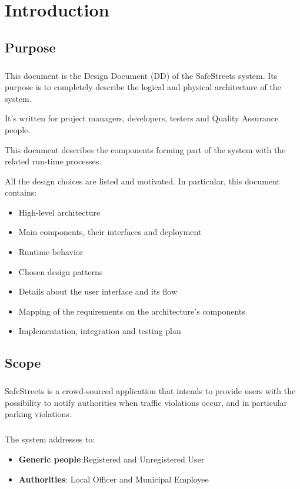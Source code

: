 	\chapter{Introduction}
		\section{Purpose}
			\paragraph{}
					This document is the Design Document (DD) of the SafeStreets system. Its purpose is to completely describe the logical and physical architecture of the system.
					
					It's written for project managers, developers, testers and Quality Assurance people.
					
					This document describes	the	components forming part of the	system with the related run-time processes.
					
					All the	design choices are listed and motivated. In particular, this document contains:
						\begin{itemize}
							\item  High-level architecture
							\item Main	components, their interfaces and deployment
							\item Runtime behavior
							\item Chosen design	patterns
							\item Details about	the	user interface and its flow
							\item Mapping of the requirements on the architecture's components
							\item Implementation, integration and testing plan
						\end{itemize}

		\section{Scope}
			\paragraph{}
				SafeStreets is a crowd-­sourced application that intends to provide users with the possibility to notify authorities when traffic violations occur, and in particular parking violations.
				
			\paragraph{}
				The system addresses to:
				\begin{itemize}
					\item \textbf{Generic people}:Registered and Unregistered User
					\item \textbf{Authorities}: Local Officer and Municipal Employee
				\end{itemize}
				
